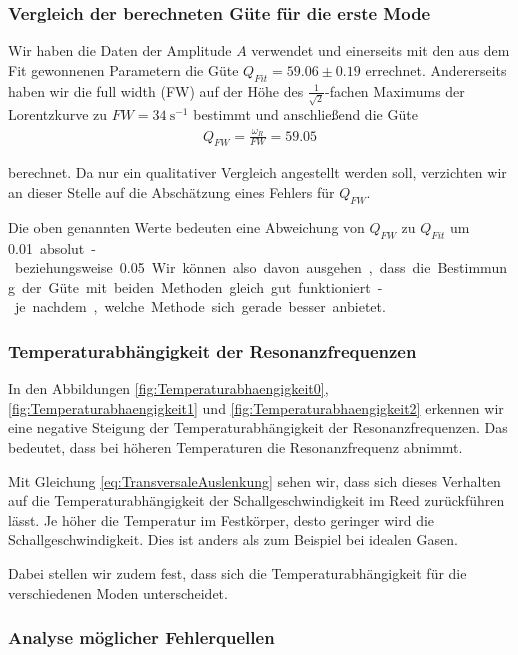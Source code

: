 \subsubsection*{Vergleich der berechneten Güte für die erste Mode}

Wir haben die Daten der Amplitude $A$ verwendet und einerseits mit den aus dem Fit gewonnenen Parametern die Güte $Q_{Fit} = 59.06 \pm 0.19$ errechnet.
Andererseits haben wir die full width (FW) auf der Höhe des $\frac{1}{\sqrt{2}}$-fachen Maximums der Lorentzkurve zu $FW = \SI{34}{\second^{-1}}$ bestimmt und anschließend die Güte
\begin{align}
    Q_{FW} = \frac{\omega_R}{FW} = 59.05
\end{align}

berechnet. Da nur ein qualitativer Vergleich angestellt werden soll, verzichten wir an dieser Stelle auf die Abschätzung eines Fehlers für $Q_{FW}$.

Die oben genannten Werte bedeuten eine Abweichung von $Q_{FW}$ zu $Q_{Fit}$ um \SI{0.01} absolut - beziehungsweise \SI{0.05}{\sigma}.
Wir können also davon ausgehen, dass die Bestimmung der Güte mit beiden Methoden gleich gut funktioniert - je nachdem, welche Methode sich gerade besser anbietet.

\subsubsection*{Temperaturabhängigkeit der Resonanzfrequenzen}

In den Abbildungen \ref{fig:Temperaturabhaengigkeit0}, \ref{fig:Temperaturabhaengigkeit1} und \ref{fig:Temperaturabhaengigkeit2} erkennen wir eine negative Steigung der Temperaturabhängigkeit der Resonanzfrequenzen.
Das bedeutet, dass bei höheren Temperaturen die Resonanzfrequenz abnimmt.

Mit Gleichung \ref{eq:TransversaleAuslenkung} sehen wir, dass sich dieses Verhalten auf die Temperaturabhängigkeit der Schallgeschwindigkeit im Reed zurückführen lässt.
Je höher die Temperatur im Festkörper, desto geringer wird die Schallgeschwindigkeit.
Dies ist anders als zum Beispiel bei idealen Gasen.

Dabei stellen wir zudem fest, dass sich die Temperaturabhängigkeit für die verschiedenen Moden unterscheidet.

\subsubsection*{Analyse möglicher Fehlerquellen}

